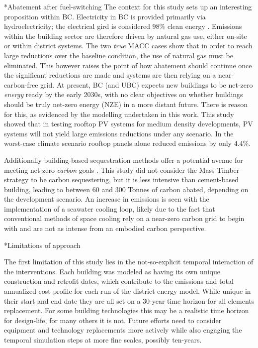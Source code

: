 \documentclass[twocolumn, a4paper,10pt]{article}
\makeatletter
\renewcommand\subsection{\@startsection{subsection}{1}{\z@}{\z@}{\z@}{\normalfont\normalsize\bfseries}}
\renewcommand\subsection{\@startsection{subsection}{1}{\z@}{\z@}{0.1pt}{\normalfont\normalsize\bfseries}}
\makeatother
\begin{document}
\subsection*{Abatement after fuel-switching}
The context for this study sets up an interesting proposition within BC. Electricity in BC is provided primarily via hydroelectricity; the electrical gird is considered 98\% clean energy \citep{bc_ministry_of_envrionmetn_and_climate_change_strategy_bc_2019}. Emissions within the building sector are therefore driven by natural gas use, either on-site or within district systems. The two \textit{true} MACC cases show that in order to reach large reductions over the baseline condition, the use of natural gas must be eliminated. This however raises the point of how abatement should continue once the significant reductions are made and systems are then relying on a near-carbon-free grid. At present, BC (and UBC) expects new buildings to be net-zero \textit{energy} ready by the early 2030s, with no clear objectives on whether buildings should be truly net-zero energy (NZE) in a more distant future. There is reason for this, as evidenced by the modelling undertaken in this work. This study showed that in testing rooftop PV systems for medium density developments, PV systems will not yield large emissions reductions under any scenario. In the worst-case climate scenario rooftop panels alone reduced emissions by only 4.4\%. 

Additionally building-based sequestration methods offer a potential avenue for meeting net-zero \textit{carbon} goals \citep{skullestad_high-rise_2016}. This study did not consider the Mass Timber strategy to be carbon sequestering, but it is less intensive than cement-based building, leading to between 60 and 300 Tonnes of carbon abated, depending on the development scenario. An increase in emissions is seen with the implementation of a seawater cooling loop, likely due to the fact that conventional methods of space cooling rely on a near-zero carbon grid to begin with and are not as intense from an embodied carbon perspective.

\subsection*{Limitations of approach}

The first limitation of this study lies in the not-so-explicit temporal interaction of the interventions. Each building was modeled as having its own unique construction and retrofit dates, which contribute to the emissions and total annualized cost profile for each run of the district energy model. While unique in their start and end date they are all set on a 30-year time horizon for all elements replacement. For some building technologies this may be a realistic time horizon for design-life, for many others it is not. Future efforts need to consider equipment and technology replacements more actively while also engaging the temporal simulation steps at more fine scales, possibly ten-years.
\end{document}
